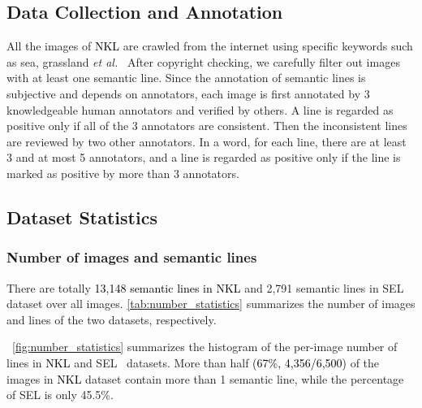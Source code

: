 \documentclass[10pt,journal,cspaper,compsoc]{IEEEtran}
\newcommand{\revise}[1]{{\textcolor{black}{#1}}}
\def\etal{\emph{et al.~}}
\begin{document}
\subsection{Data Collection and Annotation}\label{sec:data-collect-and-anno}
All the images of \revise{NKL} are crawled from the internet
using specific keywords such as sea, grassland \etal
%
After copyright checking, we carefully filter out images with
at least one semantic line.
%
Since the annotation of semantic lines is subjective and depends on annotators,
each image is first annotated by 3 knowledgeable human annotators
and verified by others.
%
A line is regarded as positive only if all of the 3 annotators are consistent.
%
Then the inconsistent lines are reviewed by two other annotators.
%
In a word, for each line, there are at least 3 and at most 5 annotators,
and a line is regarded as positive only if the line is marked as positive by more than 3 annotators.

\subsection{Dataset Statistics}
\subsubsection{Number of images and semantic lines}
%
%
There are totally \revise{13,148 semantic lines in NKL} and 2,791 semantic lines in
SEL~\cite{lee2017semantic} dataset over all images.
%
\cref{tab:number_statistics} summarizes the number of images and lines of the two datasets, respectively.

~\cref{fig:number_statistics} summarizes the histogram of the per-image number of lines
in \revise{NKL} and SEL~\cite{lee2017semantic} datasets.
%
More than half \revise{(67\%, 4,356/6,500)} of the images in \revise{NKL} dataset contain more than 1 semantic line,
while the percentage of SEL is only 45.5\%.
\end{document}
